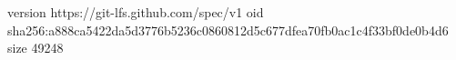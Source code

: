 version https://git-lfs.github.com/spec/v1
oid sha256:a888ca5422da5d3776b5236c0860812d5c677dfea70fb0ac1c4f33bf0de0b4d6
size 49248
